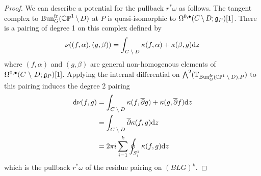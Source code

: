 \documentclass[10pt, oneside]{article}
\renewcommand{\d}{\mathrm{d}}
\newcommand{\fr}{\mathrm{fr}}
\begin{document}
\begin{proof}
We can describe a potential for the pullback $r^*\omega$ as follows.  The tangent complex to $\bun_G^\fr(\bb{CP}^1 \! \bs \! D)$ at $P$ is quasi-isomorphic to $\Omega^{0,\bullet}(C \!\ \backslash \ \! D; \mathfrak{g}_P)[1]$.  There is a pairing of degree 1 on this complex defined by
\[ \nu((f,\alpha), (g,\beta)) = \int_{C \!\bs\! D} \kappa(f,\alpha) + \kappa(\beta,g) \d z\]
where $(f,\alpha)$ and $(g,\beta)$ are general non-homogenous elements of $\Omega^{0,\bullet}(C \ \backslash \  D; \mathfrak{g}_P)[1]$.  Applying the internal differential on $\bigwedge^2 (\bb T_{\bun_G^\fr(\bb{CP}^1 \! \bs \! D), P})$ to this pairing induces the degree 2 pairing
\begin{align*}
\d \nu(f,g) &= \int_{C \!\bs\! D} \kappa(f, \ol \dd g) + \kappa(g, \ol \dd f) \d z \\
&=\int_{C \!\bs\! D} \ol \dd \kappa(f, g) \d z \\
&=2 \pi i \sum_{i=1}^k \oint_{S^1_i} \kappa(f, g) \d z
\end{align*}
which is the pullback $r^*\omega$ of the residue pairing on $(BLG)^k$.
\end{proof}
\end{document}
